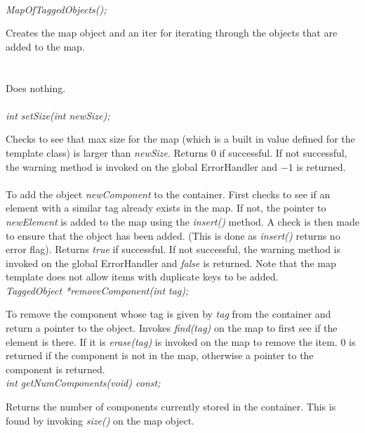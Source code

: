  \\
{\em MapOfTaggedObjects();} 

Creates the map object and an iter for iterating through the objects
that are added to the map. \\

 \\
 \\ 
Does nothing.\\

 \\
{\em int setSize(int newSize);}

Checks to see that max size for the map (which is a built in value
defined for the template class) is larger than {\em newSize}. Returns
$0$ if successful. If not successful, the warning method is invoked
on the global ErrorHandler and $-1$ is returned.\\

\\
To add the object {\em newComponent} to the container. First checks to
see if an element with a similar tag already exists in the map. If
not, the pointer to {\em newElement} is added to the map using the
{\em insert()} method. A check is then made to ensure that the object
has been added. (This is done as {\em insert()} returns no error flag).
Returns {\em true} if successful. If not successful, the warning
method is invoked on the global ErrorHandler and {\em false} is
returned. Note that the map template does not allow items with
duplicate keys to be added.\\ 
 
{\em TaggedObject *removeComponent(int tag);}

To remove the component whose tag is given by {\em tag} from the
container and return a pointer to the object. Invokes {\em find(tag)}
on the map to first see if the element is there. If it is {\em
erase(tag)} is invoked on the map to remove the item. $0$ is returned
if the component is not in the map, otherwise a pointer to the component
is returned.\\

{\em int  getNumComponents(void) const;}

Returns the number of components currently stored in the
container. This is found by invoking {\em size()} on the map object.\\

